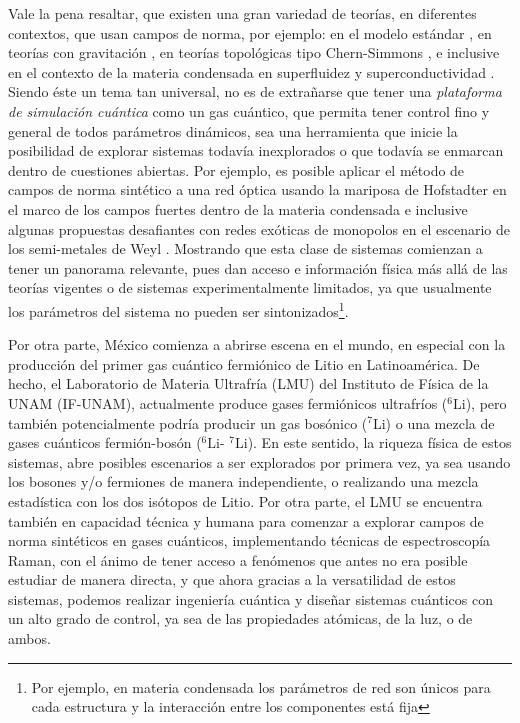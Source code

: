 \documentclass[superscriptaddress,onecolumn,aps,preprint,showpacs,nofootinbib,pra,11pt]{revtex4-2}
\begin{document}
\begin{normalsize}
Vale la pena resaltar, que existen una gran variedad de teorías, en diferentes contextos, que usan campos de norma, por ejemplo: en el modelo estándar \cite{Guidry-book2008}, en teorías con gravitación \cite{Baez-book1994}, en teorías topológicas tipo Chern-Simmons \cite{Marino-book2005}, e inclusive en el contexto de la materia condensada en superfluidez y superconductividad \cite{Kleinert-book1989a}. Siendo éste un tema tan universal, no es de extrañarse que tener una \textit{plataforma de simulación cuántica} como un gas cuántico, que permita tener control fino y general de todos parámetros dinámicos, sea una herramienta que inicie la posibilidad de explorar sistemas todavía inexplorados o que todavía se enmarcan dentro de cuestiones abiertas. Por ejemplo, es posible aplicar el método de campos de norma sintético a una red óptica usando la mariposa de Hofstadter en el marco de los campos fuertes dentro de la materia condensada \cite{Aidelsburger-prl107} e inclusive algunas propuestas desafiantes con redes exóticas de monopolos en el escenario de los semi-metales de Weyl \cite{Dubeck-prl114}. Mostrando que esta clase de sistemas comienzan a tener un panorama relevante, pues dan acceso e información física más allá de las teorías vigentes o de sistemas experimentalmente limitados, ya que usualmente los parámetros del sistema no pueden ser sintonizados\footnote{Por ejemplo, en materia condensada los parámetros de red son únicos para cada estructura y la interacción entre los componentes está fija}.\medskip

Por otra parte, México comienza a abrirse escena en el mundo, en especial con la producción del primer gas cuántico fermiónico de Litio en Latinoamérica. De hecho, el Laboratorio de Materia Ultrafría (LMU) del Instituto de Física de la UNAM (IF-UNAM), actualmente produce gases fermiónicos ultrafríos ($^{6}\mathrm{Li}$), pero también potencialmente podría producir un gas bosónico ($^{7}\mathrm{Li}$) o una mezcla de gases cuánticos fermión-bosón ($^{6}\mathrm{Li}$- $^{7}\mathrm{Li}$). En este sentido, la riqueza física de estos sistemas, abre posibles escenarios a ser explorados por primera vez, ya sea usando los bosones y/o fermiones de manera independiente, o realizando una mezcla estadística con los dos isótopos de Litio. Por otra parte, el LMU se encuentra también en capacidad técnica y humana para comenzar a explorar campos de norma sintéticos en gases cuánticos, implementando técnicas de espectroscopía Raman, con el ánimo de  tener acceso a fenómenos que antes no era posible estudiar de manera directa, y que ahora gracias a la versatilidad de estos sistemas, podemos realizar ingeniería cuántica y diseñar sistemas cuánticos con un alto grado de control, ya sea de las propiedades atómicas, de la luz, o de ambos.


\end{normalsize}
\end{document}
